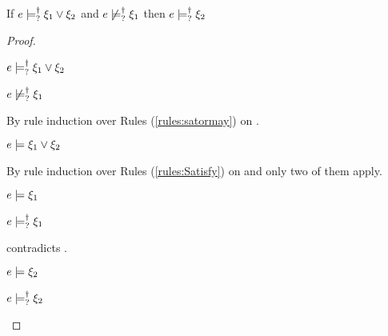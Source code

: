 \begin{lemma}
  \label{lem:satisfy-substraction}
  If $e \models_{?}^{\dag} \xi_1 \vee \xi_2$ and $e \not\models_{?}^{\dag} \xi_1$ then $e \models_{?}^{\dag} \xi_2$
\end{lemma}
\begin{proof}
  \begin{pfsteps*}
  \item $e \models_{?}^{\dag} \xi_1 \vee \xi_2$  
  \item $e \not\models_{?}^{\dag} \xi_1$  
  \end{pfsteps*}
  By rule induction over Rules (\ref{rules:satormay}) on .
  \begin{byCases}

  \item[\text{(\ref{rule:CSMSSat})}]
    \begin{pfsteps*}
    \item $e \models \xi_1 \vee \xi_2$  
    \end{pfsteps*}
    By rule induction over Rules (\ref{rules:Satisfy}) on  and only two of them apply.
    \begin{byCases}

    \item[\text{(\ref{rule:CSOr1})}]
      \begin{pfsteps*}
      \item $e \models \xi_1$  
      \item $e \models_{?}^{\dag} \xi_1$  
      \end{pfsteps*}
       contradicts .

    \item[\text{(\ref{rule:CSOr2})}]
      \begin{pfsteps*}
      \item $e \models \xi_2$  
      \item $e \models_{?}^{\dag} \xi_2$ 
      \end{pfsteps*}
    \end{byCases}


\end{byCases}
\end{proof}
